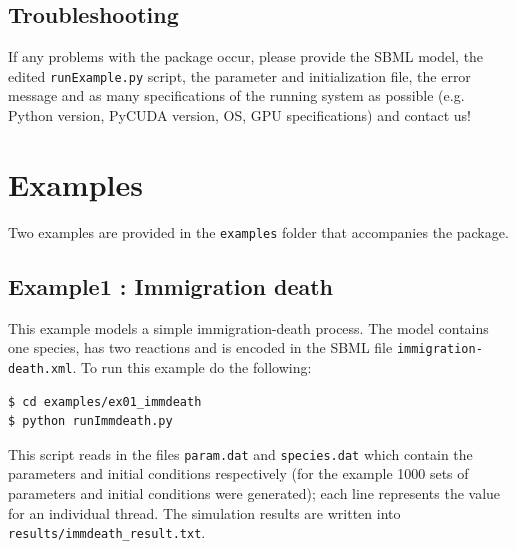 \documentclass [11pt, a4paper, openany, twoside=off] {article}
\begin{document}


\subsection{Troubleshooting}
If any problems with the package occur, please provide the SBML model, the edited \verb$runExample.py$ script, the parameter and initialization file, the error message and as many specifications of the running system as possible (e.g. Python version, PyCUDA version, OS, GPU specifications) and contact us!

\newpage
\section{Examples}
Two examples are provided in the \verb$examples$ folder that accompanies the package.

\subsection{Example1 : Immigration death}
This example models a simple immigration-death process. The model contains one species, has two reactions and is encoded in the SBML file \verb$immigration-death.xml$.
To run this example do the following:
\begin{verbatim}
$ cd examples/ex01_immdeath 
$ python runImmdeath.py
\end{verbatim}
This script reads in the files \verb$param.dat$ and \verb$species.dat$ which contain the parameters and initial conditions respectively (for the example 1000 sets of parameters and initial conditions were generated); each line represents the value for an individual thread. The simulation results are written into \verb$results/immdeath_result.txt$. 
\end{document}
